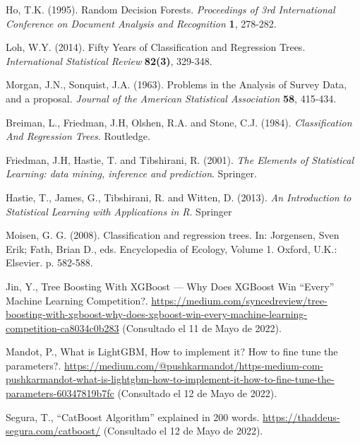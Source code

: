 \documentclass[12pt,twoside]{article}
\begin{document}
\begin{thebibliography}{100}
 Ho, T.K. (1995). Random Decision Forests. \textit{Proceedings of 3rd International Conference on Document Analysis and Recognition} \textbf{1}, 278-282.

 Loh, W.Y. (2014). Fifty Years of Classification and Regression Trees. \textit{International Statistical Review}
\textbf{82(3)}, 329-348.

 Morgan, J.N., Sonquist, J.A. (1963). Problems in the Analysis of Survey Data, and a proposal. \textit{Journal of the American Statistical Association} \textbf{58}, 415-434.



 Breiman, L., Friedman, J.H, Olshen, R.A. and Stone, C.J. (1984).
\textit{Classification And Regression Trees}. Routledge.

 Friedman, J.H, Hastie, T. and Tibshirani, R. (2001).
\textit{The Elements of Statistical Learning: data mining, inference and prediction}. Springer.

 Hastie, T., James, G., Tibshirani, R. and Witten, D. (2013).
\textit{An Introduction to Statistical Learning with Applications in R}. Springer



 Moisen, G. G. (2008). Classification and regression trees. In: Jorgensen, Sven Erik; Fath, Brian D., eds. Encyclopedia of Ecology, Volume 1. Oxford, U.K.: Elsevier. p. 582-588.



 Jin, Y., Tree Boosting With XGBoost — Why Does XGBoost Win ``Every'' Machine Learning Competition?. \url{https://medium.com/syncedreview/tree-boosting-with-xgboost-why-does-xgboost-win-every-machine-learning-competition-ca8034c0b283} (Consultado el 11 de Mayo de 2022).

 Mandot, P., What is LightGBM, How to implement it? How to fine tune the parameters?. \url{https://medium.com/@pushkarmandot/https-medium-com-pushkarmandot-what-is-lightgbm-how-to-implement-it-how-to-fine-tune-the-parameters-60347819b7fc} (Consultado el 12 de Mayo de 2022).

 Segura, T., ``CatBoost Algorithm'' explained in 200 words. \url{https://thaddeus-segura.com/catboost/} (Consultado el 12 de Mayo de 2022).

\end{thebibliography}
\end{document}
